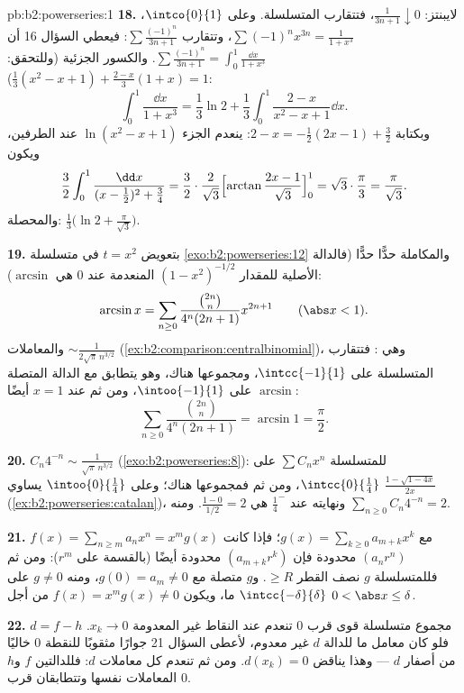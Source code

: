 \begin{solution}{pb:b2:powerseries:1}
\textbf{18.} لايبنتز: $\frac{1}{3n+1}\downarrow0$، فتتقارب المتسلسلة.
وعلى $\intco{0}{1}$، $\sum(-1)^nx^{3n} =
\frac{1}{1+x^3}$، وتتقارب $\sum\frac{(-1)^n}{3n+1}$:
فيعطي السؤال 16 أن $\sum\frac{(-1)^n}{3n+1} =
\int_0^1\frac{\dd x}{1+x^3}$. والكسور الجزئية (وللتحقق:
$\frac13(x^2-x+1) + \frac{2-x}{3}(1+x) = 1$):
\[
\int_0^1\frac{\dd x}{1+x^3}
= \frac13\ln2 + \frac13\int_0^1\frac{2-x}{x^2-x+1}\dd x .
\]
وبكتابة $2 - x = -\frac12(2x-1) + \frac32$: ينعدم الجزء $\ln(x^2-x+1)$
عند الطرفين، ويكون
\[
\frac32\int_0^1\frac{\dd x}{(x-\frac12)^2 + \frac34}
= \frac32\cdot\frac{2}{\sqrt3}
\Bigl[\arctan\frac{2x-1}{\sqrt3}\Bigr]_0^1
= \sqrt3\cdot\frac{\pi}{3} = \frac{\pi}{\sqrt3} .
\]
والمحصلة: $\frac13\bigl(\ln2 + \frac{\pi}{\sqrt3}\bigr)$.

\textbf{19.} بتعويض $t = x^2$ في متسلسلة
\cref{exo:b2:powerseries:12} والمكاملة حدًّا
حدًّا (فالدالة الأصلية للمقدار $(1-x^2)^{-1/2}$ المنعدمة عند $0$ هي
$\arcsin$):
\[
\arcsin x = \sum_{n\geq0}
\frac{\binom{2n}n}{4^n(2n+1)}x^{2n+1}
\qquad(\abs x < 1) .
\]
والمعاملات $\sim \frac{1}{2\sqrt\pi\,n^{3/2}}$
(\cref{ex:b2:comparison:centralbinomial})، وهي : فتتقارب المتسلسلة
\emph{} على $\intcc{-1}{1}$، ومجموعها
 هناك، وهو يتطابق مع الدالة المتصلة $\arcsin$
على $\intoo{-1}{1}$، ومن ثم عند $x = 1$ أيضًا:
\[
\sum_{n\geq0}\frac{\binom{2n}n}{4^n(2n+1)}
= \arcsin 1 = \frac\pi2 .
\]

\textbf{20.} $C_n4^{-n} \sim \frac{1}{\sqrt\pi\,n^{3/2}}$
(\cref{exo:b2:powerseries:8}):  للمتسلسلة $\sum
C_nx^n$ على $\intcc{0}{\frac14}$، ومن ثم فمجموعها 
هناك؛ وعلى $\intoo{0}{\frac14}$ يساوي
$\frac{1-\sqrt{1-4x}}{2x}$
(\cref{ex:b2:powerseries:catalan})، ونهايته عند
$\frac14^-$ هي $\frac{1-0}{1/2} = 2$. ومنه $\sum_{n\geq0}
C_n4^{-n} = 2$.

\textbf{21.} $f(x) = \sum_{n\geq m}a_nx^n = x^m g(x)$ مع
$g(x) = \sum_{k\geq0}a_{m+k}x^k$؛ فإذا كانت $(a_nr^n)$ محدودة فإن
$(a_{m+k}r^k)$ محدودة أيضًا (بالقسمة على $r^m$): ومن ثم فللمتسلسلة $g$ نصف القطر $\geq
R$. و$g$ متصلة مع $g(0) = a_m \neq 0$، ومنه $g \neq 0$
على $\intcc{-\delta}{\delta}$ ما، ويكون $f(x) = x^mg(x) \neq 0$
من أجل $0 < \abs x \leq \delta$.

\textbf{22.} $d = f - h$ مجموع متسلسلة قوى قرب $0$
تنعدم عند النقاط غير المعدومة $x_k \to 0$. فلو كان معامل
ما للدالة $d$ غير معدوم، لأعطى السؤال 21 جوارًا مثقوبًا
للنقطة $0$ خاليًا من أصفار $d$ ---
وهذا يناقض $d(x_k) = 0$. ومن ثم تنعدم كل معاملات $d$:
فللدالتين $f$ و$h$ المعاملات نفسها وتتطابقان قرب $0$.


\end{solution}
